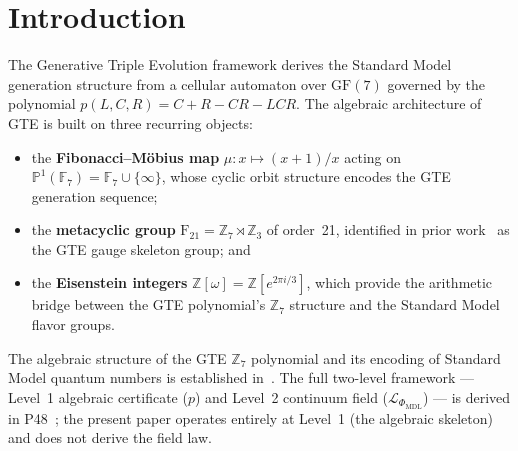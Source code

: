 \documentclass[11pt]{article}
\theoremstyle{remark}
\newcommand{\PHIMDL}{\ensuremath{\Phi_{\mathrm{MDL}}}}
\newcommand{\GF}[1]{\ensuremath{\mathrm{GF}(#1)}}
\newcommand{\PSLtwo}{\ensuremath{\mathrm{PSL}(2,7)}}
\newcommand{\FineSeven}{\ensuremath{\mathrm{F}_{21}}}
\newcommand{\Zcyc}[1]{\ensuremath{\mathbb{Z}_{#1}}}
\newcommand{\AltFour}{\ensuremath{A_4}}
\newcommand{\Eisenstein}{\ensuremath{\mathbb{Z}[\omega]}}
\newcommand{\ProjLine}{\ensuremath{\mathbb{P}^1(\mathbb{F}_7)}}
\newcommand{\CatAD}{\textbf{A/D}}
\newcommand{\CatD}{\textbf{D}}
\begin{document}
\begin{abstract}
These five results establish a coherent group-theoretic skeleton: $\PSLtwo$ contains
$\FineSeven$ as its Borel subgroup, acts as the automorphism group of the Fano
plane (with $\FineSeven$ as its regular flag-transitive subgroup), and is the
automorphism group of the genus-3 Klein quartic.
The shared $\mu_3$ factor links $\FineSeven$ to $\AltFour$ via the Eisenstein functor,
and the manifest $S_3 \leq \AltFour$ embedding (result~5) completes the leading-order
neutrino flavor mixing group (\CatAD).

The physical interpretation — $\FineSeven$ as gauge skeleton group, $\AltFour$ as
the GTE leading-order neutrino flavor symmetry yielding tri-bimaximal mixing
angles, and the Klein quartic as the geometric reason for three generations — is
argued at level \CatAD{} or \CatD{} as stated.
\end{abstract}

\tableofcontents

\newpage

\section{Introduction}
\label{sec:intro}

The Generative Triple Evolution framework derives the Standard Model generation
structure from a cellular automaton over $\GF{7}$ governed by the polynomial
$p(L,C,R) = C + R - CR - LCR$.
The algebraic architecture of GTE is built on three recurring objects:
\begin{itemize}
  \item the \textbf{Fibonacci--Möbius map} $\mu: x \mapsto (x+1)/x$ acting on
    $\ProjLine = \mathbb{F}_7 \cup \{\infty\}$, whose cyclic orbit structure
    encodes the GTE generation sequence;
  \item the \textbf{metacyclic group} $\FineSeven = \Zcyc{7} \rtimes \Zcyc{3}$
    of order~21, identified in prior work~\cite{SpivackGTEMobius} as the GTE gauge
    skeleton group; and
  \item the \textbf{Eisenstein integers} $\Eisenstein = \mathbb{Z}[e^{2\pi i/3}]$,
    which provide the arithmetic bridge between the GTE polynomial's $\mathbb{Z}_7$
    structure and the Standard Model flavor groups.
\end{itemize}
The algebraic structure of the GTE $\mathbb{Z}_7$ polynomial and its encoding of
Standard Model quantum numbers is established in~\cite{SpivackGTEPolynomialWolfram}.
The full two-level framework --- Level~1 algebraic certificate ($p$) and Level~2
continuum field ($\mathcal{L}_{\PHIMDL}$) --- is derived in
P48~\cite{SpivackGTECompleteFramework}; the present paper operates entirely at
Level~1 (the algebraic skeleton) and does not derive the field law.
\end{document}
